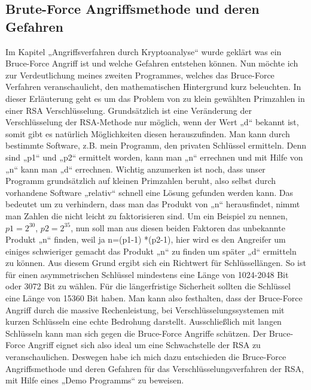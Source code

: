 \subsection{Brute-Force Angriffsmethode und deren Gefahren}
Im Kapitel „Angriffsverfahren durch Kryptoanalyse“ wurde geklärt was ein Bruce-Force Angriff ist und welche Gefahren entstehen können. Nun möchte ich zur Verdeutlichung meines zweiten Programmes, welches das Bruce-Force Verfahren veranschaulicht, den mathematischen Hintergrund kurz beleuchten. In dieser Erläuterung geht es um das Problem von zu klein gewählten Primzahlen in einer RSA Verschlüsselung. Grundsätzlich ist eine Veränderung der Verschlüsselung der RSA-Methode nur möglich, wenn der Wert „d“ bekannt ist, somit gibt es natürlich Möglichkeiten diesen herauszufinden. Man kann durch bestimmte Software, z.B. mein Programm, den privaten Schlüssel ermitteln. Denn sind „p1“ und „p2“ ermittelt worden, kann man „n“ errechnen und mit Hilfe von „n“ kann man „d“ errechnen. Wichtig anzumerken ist noch, dass unser Programm grundsätzlich auf kleinen Primzahlen beruht, also selbst durch vorhandene Software „relativ“ schnell eine Lösung gefunden werden kann. Das bedeutet um zu verhindern, dass man das Produkt von „n“ herausfindet, nimmt man Zahlen die nicht leicht zu faktorisieren sind. Um ein Beispiel zu nennen, $p1=2^30$, $p2=2^35$, nun soll man aus diesen beiden Faktoren das unbekannte Produkt „n“ finden, weil ja n=(p1-1) *(p2-1), hier wird es den Angreifer um einiges schwieriger gemacht das Produkt „n“ zu finden um später „d“ ermitteln zu können. Aus diesem Grund ergibt sich ein Richtwert für Schlüssellängen. So ist für einen asymmetrischen Schlüssel mindestens eine Länge von 1024-2048 Bit oder 3072 Bit zu wählen. Für die längerfristige Sicherheit sollten die Schlüssel eine Länge von 15360 Bit haben. Man kann also festhalten, dass der Bruce-Force Angriff durch die massive Rechenleistung, bei Verschlüsselungssystemen mit kurzen Schlüsseln eine echte Bedrohung darstellt. Ausschließlich mit langen Schlüsseln kann man sich gegen die Bruce-Force Angriffe schützen. Der Bruce-Force Angriff eignet sich also ideal um eine Schwachstelle der RSA zu veranschaulichen. Deswegen habe ich mich dazu entschieden die Bruce-Force Angriffsmethode und deren Gefahren für das Verschlüsselungsverfahren der RSA, mit Hilfe eines „Demo Programms“ zu beweisen.

